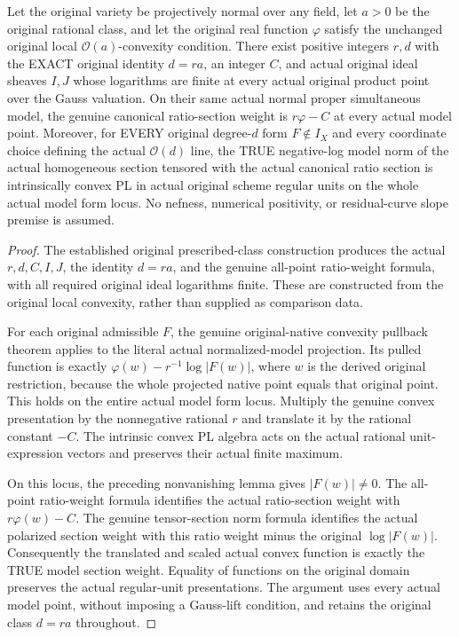\begin{theorem}
\label{local:actual-prescribed-class-intrinsic-convex-normal-model}
\leanok
{}
Let the original variety be projectively normal over any field, let
$a>0$ be the original rational class, and let the original real function
$\varphi$ satisfy the unchanged original local $\mathcal O(a)$-convexity
condition. There exist positive integers $r,d$ with the EXACT original
identity $d=ra$, an integer $C$, and actual original ideal sheaves $I,J$
whose logarithms are finite at every actual original product point over the
Gauss valuation. On their same actual normal proper simultaneous model,
the genuine canonical ratio-section weight is $r\varphi-C$ at every actual
model point. Moreover, for EVERY original degree-$d$ form $F\notin I_X$
and every coordinate choice defining the actual $\mathcal O(d)$ line, the
TRUE negative-log model norm of the actual homogeneous section tensored
with the actual canonical ratio section is intrinsically convex PL in
actual original scheme regular units on the whole actual model form locus.
No nefness, numerical positivity, or residual-curve slope premise is assumed.
\end{theorem}
\begin{proof}
The established original prescribed-class construction produces the actual
$r,d,C,I,J$, the identity $d=ra$, and the genuine all-point ratio-weight
formula, with all required original ideal logarithms finite. These are
constructed from the original local convexity, rather than supplied as
comparison data.

For each original admissible $F$, the genuine original-native convexity
pullback theorem applies to the literal actual normalized-model projection.
Its pulled function is exactly
$\varphi(w)-r^{-1}\log|F(w)|$, where $w$ is the derived original restriction,
because the whole projected native point equals that original point. This
holds on the entire actual model form locus. Multiply the genuine convex
presentation by the nonnegative rational $r$ and translate it by the rational
constant $-C$. The intrinsic convex PL algebra acts on the actual rational
unit-expression vectors and preserves their actual finite maximum.

On this locus, the preceding nonvanishing lemma gives $|F(w)|\ne0$.
The all-point ratio-weight formula identifies the actual ratio-section weight
with $r\varphi(w)-C$. The genuine tensor-section norm formula identifies
the actual polarized section weight with this ratio weight minus the
original $\log|F(w)|$. Consequently the translated and scaled actual convex
function is exactly the TRUE model section weight. Equality of functions on
the original domain preserves the actual regular-unit presentations. The
argument uses every actual model point, without imposing a Gauss-lift condition,
and retains the original class $d=ra$ throughout.
\end{proof}
